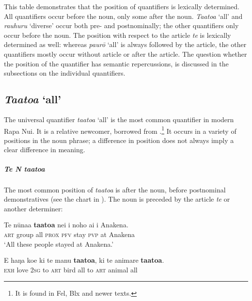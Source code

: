 
This table demonstrates that the position of quantifiers is lexically determined. All quantifiers occur before the noun, only some after the noun. \textit{Ta}\textit{{\ꞌ}ato{\ꞌ}a} ‘all’ and \textit{rauhuru} ‘diverse’ occur both pre- and postnominally; the other quantifiers only occur before the noun. The position with respect to the article \textit{te} is lexically determined as well: whereas \textit{paurō} ‘all’ is always followed by the article, the other quantifiers mostly occur without article or after the article. The question whether the position of the quantifier has semantic repercussions, is discussed in the subsections on the individual quantifiers.

\subsection{\textit{Ta{\ꞌ}ato{\ꞌ}a} ‘all’}\label{sec:4.4.2}
The universal quantifier \textit{ta{\ꞌ}ato{\ꞌ}a} ‘all’ is the most common quantifier in modern Rapa Nui. It is a relative newcomer, borrowed from .\footnote{\label{fn:182}It is found in Fel, Blx and newer texts.} It occurs in a variety of positions in the noun phrase; a difference in position does not always imply a clear difference in meaning. 

\subparagraph{\textit{Te N ta{\ꞌ}ato{\ꞌ}a}} The most common position of \textit{ta{\ꞌ}ato{\ꞌ}a} is after the noun, before postnominal demonstratives (see the chart in ). The noun is preceded by the article \textit{te} or another determiner:

\ea\label{ex:4.49}
\gll Te nūna{\ꞌ}a \textbf{ta{\ꞌ}ato{\ꞌ}a} nei i noho ai {\ꞌ}i {\ꞌ}Anakena.\\
\textsc{art} group all \textsc{prox} \textsc{pfv} stay \textsc{pvp} at Anakena\\

\glt 
‘All these people stayed at Anakena.’ \textstyleExampleref{[R376.036]} 
\z

\ea\label{ex:4.50}
\gll E haŋa koe ki te manu \textbf{ta{\ꞌ}ato{\ꞌ}a}, ki te {\ꞌ}animare \textbf{ta{\ꞌ}ato{\ꞌ}a}. \\
\textsc{exh} love \textsc{2sg} to \textsc{art} bird all to \textsc{art} animal all \\

